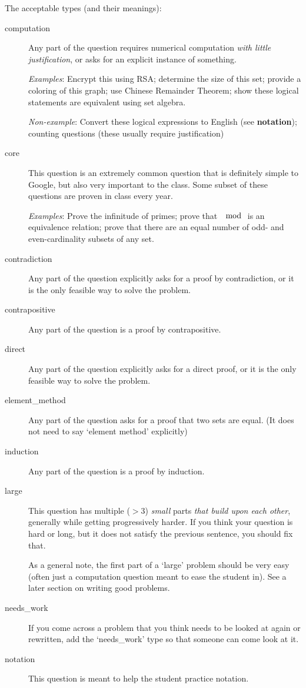     The acceptable types (and their meanings):
    \begin{description}
      \item[computation] Any part of the question requires numerical computation \textit{with little justification}, or asks for an explicit instance of something.
      
      \textit{Examples}: Encrypt this using RSA; determine the size of this set; provide a coloring of this graph; use Chinese Remainder Theorem; show these logical statements are equivalent using set algebra.
      
      \textit{Non-example}: Convert these logical expressions to English (see \textbf{notation}); counting questions (these usually require justification)
      \item[core] This question is an extremely common question that is definitely simple to Google, but also very important to the class. Some subset of these questions are proven in class every year.
      
      \textit{Examples}: Prove the infinitude of primes; prove that $\mod$ is an equivalence relation; prove that there are an equal number of odd- and even-cardinality subsets of any set.
      \item[contradiction] Any part of the question explicitly asks for a proof by contradiction, or it is the only feasible way to solve the problem.
      \item[contrapositive] Any part of the question is a proof by contrapositive.
      \item[direct] Any part of the question explicitly asks for a direct proof, or it is the only feasible way to solve the problem.
      \item[element\_method] Any part of the question asks for a proof that two sets are equal. (It does not need to say `element method' explicitly)
      \item[induction] Any part of the question is a proof by induction.
      \item[large] This question has multiple ($>3$) \textit{small} parts \textit{that build upon each other}, generally while getting progressively harder. If you think your question is hard or long, but it does not satisfy the previous sentence, you should fix that.
      
      As a general note, the first part of a `large' problem should be very easy (often just a computation question meant to ease the student in). See a later section on writing good problems.
      \item[needs\_work] If you come across a problem that you think needs to be looked at again or rewritten, add the `needs\_work' type so that someone can come look at it. 
      \item[notation] This question is meant to help the student practice notation.
      

\end{description}

